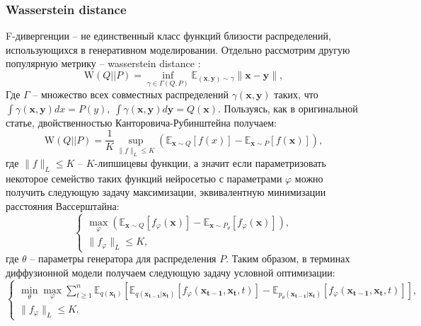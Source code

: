 \documentclass{article}
\begin{document}
\subsubsection{Wasserstein distance}
F-дивергенции -- не единственный класс функций близости распределений, использующихся в генеративном моделировании. Отдельно рассмотрим другую популярную метрику -- wasserstein distance \cite{https://doi.org/10.48550/arxiv.1701.07875, DBLP:journals/corr/GulrajaniAADC17}:
\begin{equation}
	\text{W}(Q||P) = \inf\limits_{\gamma \in \Gamma(Q,P)} \mathbb{E}_{(\mathbf{x},\mathbf{y})\sim \gamma} \|\mathbf{x}-\mathbf{y}\|,
\end{equation}
Где $\Gamma$ -- множество всех совместных распределений  $\gamma(\mathbf{x},\mathbf{y})$ таких, что $\int \gamma(\mathbf{x},\mathbf{y}) dx = P(y),~\int \gamma(\mathbf{x},\mathbf{y}) d\mathbf{y} = Q(\mathbf{x})$. Пользуясь, как в оригинальной статье, двойственностью Канторовича-Рубинштейна получаем:
\begin{equation}
	\text{W}(Q||P) = \frac{1}{K}\sup\limits_{\|f\|_L\leqslant K}\left( \mathbb{E}_{\mathbf{x}\sim Q} [f(x)] - \mathbb{E}_{\mathbf{x}\sim P} [f(\mathbf{x})]\right),
\end{equation}
где $\|f\|_L\leqslant K$ -- $K$-липшицевы функции, а значит если параметризовать некоторое семейство таких функций нейросетью с параметрами $\varphi$ можно получить следующую задачу максимизации, эквивалентную минимизации расстояния Вассерштайна:
\begin{equation}
	\begin{cases}
	\max\limits_{\varphi}\left(\mathbb{E}_{\mathbf{x}\sim Q} [f_\varphi(\mathbf{x})] - \mathbb{E}_{\mathbf{x}\sim P_\theta} [f_\varphi(\mathbf{x})]\right),\\
		\|f_\varphi\|_L \leqslant K,
\end{cases}
\end{equation}
где $\theta$ -- параметры генератора для распределения $P$. Таким образом, в терминах диффузионной модели получаем следующую задачу условной оптимизации:
\begin{equation}
	\begin{cases}
	\min\limits_\theta\max\limits_\varphi\sum\limits_{t\geqslant 1}^n \mathbb{E}_{q(\mathbf{x_t})}\left[\mathbb{E}_{q(\mathbf{x_{t-1}}|\mathbf{x_t})}\left[f_\varphi(\mathbf{x_{t-1}}, \mathbf{x_t}, t)\right] - \mathbb{E}_{p_\theta(\mathbf{x_{t-1}}|\mathbf{x_t})}\left[f_\varphi(\mathbf{x_{t-1}}, \mathbf{x_t}, t)\right]\right],\\
	\|f_\varphi\|_L \leqslant K.
	\end{cases}
\end{equation}\\
\end{document}
